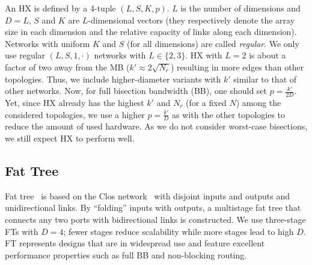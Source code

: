 \noindent
{}
%
An HX is defined by a 4-tuple $(L, S, K, p)$. $L$ is the number of dimensions
and $D=L$, $S$ and $K$ are $L$-dimensional vectors (they respectively denote
the array size in each dimension and the relative capacity of links along each
dimension). Networks with uniform $K$ and $S$ (for all dimensions) are called
\emph{regular}. We only use regular $(L, S, 1, \cdot)$ networks with $L \in
\{2,3\}$.
%
HX with $L=2$ is about a factor of two away from the MB ($k' \approx 2
\sqrt{N_r}$) resulting in more edges than other topologies. Thus, we include
higher-diameter variants with $k'$ similar to that of other networks.
%
Now, for full bisection bandwidth (BB), one should set $p = \frac{k'}{2D}$.
Yet, since HX already has the highest $k'$ and $N_r$ (for a fixed $N$) among
the considered topologies, we use a higher $p = \frac{k'}D$ as with the other
topologies to reduce the amount of used hardware. As we do not consider
worst-case bisections, we still expect HX to perform well.

\subsection{Fat Tree}
 
%
Fat tree~\cite{leiserson1996cm5} is based on the Clos
network~\cite{clos1953study} with disjoint inputs and outputs and
unidirectional links. By ``folding'' inputs with outputs, a multistage fat tree
that connects any two ports with bidirectional links is constructed. We use
three-stage FTs with $D = 4$; fewer stages reduce scalability while more stages
lead to high $D$.
%
%
FT represents designs that are in widespread use and feature excellent
performance properties such as full BB and non-blocking routing. 


